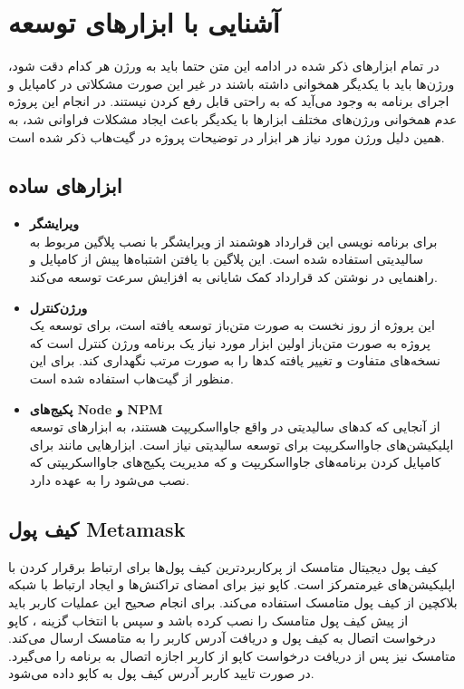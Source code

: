 \chapter{آشنایی با ابزار‌های توسعه}
در تمام ابزارهای ذکر شده در ادامه این متن حتما باید به ورژن هر کدام دقت شود،
ورژن‌ها باید با یکدیگر همخوانی داشته باشند در غیر این صورت مشکلاتی در
کامپایل و اجرای برنامه به وجود می‌آید که به راحتی قابل رفع کردن نیستند.
در انجام این پروژه عدم همخوانی ورژن‌های مختلف ابزارها با یکدیگر باعث ایجاد مشکلات فراوانی شد،
به همین دلیل ورژن مورد نیاز هر ابزار در توضیحات پروژه در گیت‌هاب ذکر شده است.

\section{ابزارهای ساده}
\begin{itemize}
	\item \textbf{ویرایشگر}\\
	برای برنامه نویسی این قرارداد هوشمند از ویرایشگر
	با نصب پلاگین مربوط به سالیدیتی
استفاده شده است.
این پلاگین با یافتن اشتباه‌ها پیش از کامپایل و راهنمایی در نوشتن کد قرارداد
کمک شایانی به افزایش سرعت توسعه می‌کند.

	\item \textbf{ورژن‌کنترل}\\
	این پروژه از روز نخست به صورت متن‌باز توسعه یافته است،
	برای توسعه یک پروژه به صورت متن‌باز اولین ابزار مورد نیاز یک برنامه ورژن کنترل است
	که نسخه‌های متفاوت و تغییر یافته کدها را به صورت مرتب نگهداری کند.
	برای این منظور از گیت‌هاب
	استفاده شده است.

	\item \textbf{پکیج‌های Node و NPM}\\
از آنجایی که کدهای سالیدیتی در واقع جاوا‌اسکریپت هستند،
به ابزارهای توسعه اپلیکیشن‌های جاوااسکریپت برای توسعه سالیدیتی نیاز است. ابزارهایی مانند
برای کامپایل کردن برنامه‌های جاوااسکریپت و
که مدیریت پکیج‌های جاوااسکریپتی که نصب می‌شود را به عهده دارد.

\end{itemize}


\section{کیف پول \gls{Metamask}}
کیف پول دیجیتال متامسک از پرکاربردترین کیف پول‌ها
برای ارتباط برقرار کردن با اپلیکیشن‌های غیرمتمرکز است.
کاپو نیز برای امضای تراکنش‌ها و ایجاد ارتباط با شبکه بلاکچین از کیف پول متامسک استفاده می‌کند.
برای انجام صحیح این عملیات کاربر باید از پیش کیف پول متامسک را نصب کرده باشد و سپس با انتخاب گزینه
،
کاپو درخواست اتصال به کیف پول و دریافت آدرس کاربر را به متامسک ارسال می‌کند.
متامسک نیز پس از دریافت درخواست کاپو از کاربر اجازه اتصال به برنامه را می‌گیرد.
در صورت تایید کاربر آدرس کیف پول به کاپو داده می‌شود.

